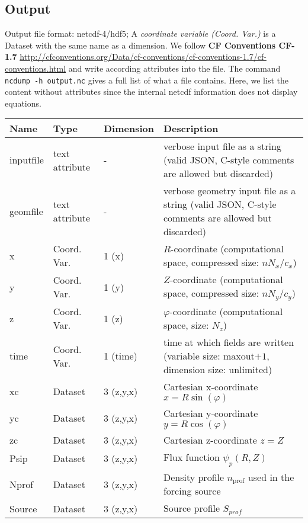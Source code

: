 \subsection{Output} \label{sec:output_file}
Output file format: netcdf-4/hdf5; A \textit{coordinate variable (Coord. Var.)} is a Dataset with the same name as a dimension.
We follow \textbf{CF Conventions CF-1.7}
\url{http://cfconventions.org/Data/cf-conventions/cf-conventions-1.7/cf-conventions.html}
and write according attributes into the file.
The command \texttt{ncdump -h output.nc} gives a full list of what a file contains.
Here, we list the content without attributes
since the internal netcdf information does not display equations.
%
\begin{longtable}{lll>{\RaggedRight}p{7cm}}
\toprule
\rowcolor{gray!50}\textbf{Name} &  \textbf{Type} & \textbf{Dimension} & \textbf{Description}  \\ \midrule
inputfile  &     text attribute & - & verbose input file as a string (valid JSON, C-style comments are allowed but discarded) \\
geomfile   &     text attribute & - & verbose geometry input file as a string (valid JSON, C-style comments are allowed but discarded) \\
x                & Coord. Var. & 1 (x) & $R$-coordinate (computational space, compressed size: $nN_x/c_x$)\\
y                & Coord. Var. & 1 (y) & $Z$-coordinate (computational space, compressed size: $nN_y/c_y$)\\
z                & Coord. Var. & 1 (z) & $\varphi$-coordinate (computational space, size: $N_z$) \\
time             & Coord. Var. & 1 (time)& time at which fields are written (variable size: maxout$+1$, dimension size: unlimited) \\
xc           & Dataset & 3 (z,y,x) & Cartesian x-coordinate $x=R\sin(\varphi)$ \\
yc           & Dataset & 3 (z,y,x) & Cartesian y-coordinate $y=R\cos(\varphi)$\\
zc           & Dataset & 3 (z,y,x) & Cartesian z-coordinate $z=Z$ \\
Psip             & Dataset & 3 (z,y,x) & Flux function $\psi_p(R,Z)$ \\
Nprof            & Dataset & 3 (z,y,x) & Density profile $n_\text{prof}$ used in the forcing source \\
Source           & Dataset & 3 (z,y,x) & Source profile $S_{prof}$\\

\end{longtable}
